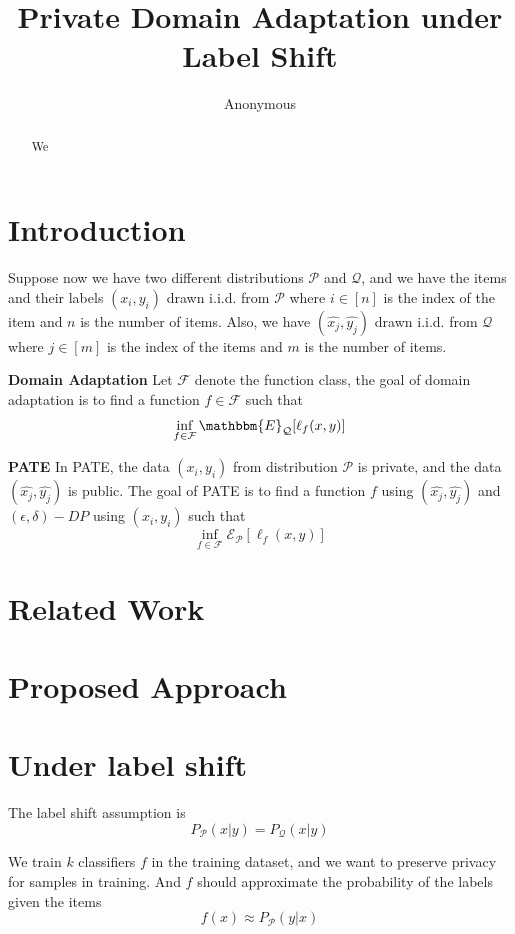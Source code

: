 \documentclass{article}
\title{Private Domain Adaptation under Label Shift}
\author{
	Anonymous
}
\theoremstyle{definition}
\def\cE{\mathcal{E}}
\begin{document}
\maketitle

\begin{abstract}
    We
\end{abstract}

\section{Introduction}
Suppose now we have two different distributions $\mathcal{P}$ and $\mathcal{Q}$, and we have the items and their labels $(x_i,y_i)$ drawn i.i.d. from $\mathcal{P}$ where $i\in [n]$ is the index of the item and $n$ is the number of items. Also, we have $(\hat{x_j},\hat{y_j})$ drawn i.i.d. from $\mathcal{Q}$ where $j\in [m]$ is the index of the items and $m$ is the number of items.

\textbf{Domain Adaptation}
Let $\mathcal{F}$ denote the function class, the goal of domain adaptation is to find a function $f\in \mathcal{F}$ such that
\begin{align*}
    \inf_{f\in \mathcal{F}} \mathbbm{E}_{\mathcal{Q}}[ \ell_f (x,y)]
\end{align*}

\textbf{PATE}
In PATE, the data $(x_i, y_i)$ from distribution $\mathcal{P}$ is private, and the data $(\hat{x_j}, \hat{y_j})$ is public. The goal of PATE is to find a function $f$ using $(\hat{x_j}, \hat{y_j})$ and $(\epsilon,\delta)-DP$ using $(x_i, y_i)$ such that
\[
\inf_{f\in \mathcal{F}} \cE_{\mathcal{P}}[ \ell_f (x,y)]
\]

\section{Related Work}

\section{Proposed Approach}
\section{Under label shift}
The label shift assumption is
\[
P_{\mathcal{P}}(x|y) = P_{\mathcal{Q}}(x|y)
\]

We train $k$ classifiers $f$ in the training dataset, and we want to preserve privacy for samples in training. And $f$ should approximate the probability of the labels given the items
\[
f(x)\approx P_\mathcal{P}(y|x)
\]
\end{document}
